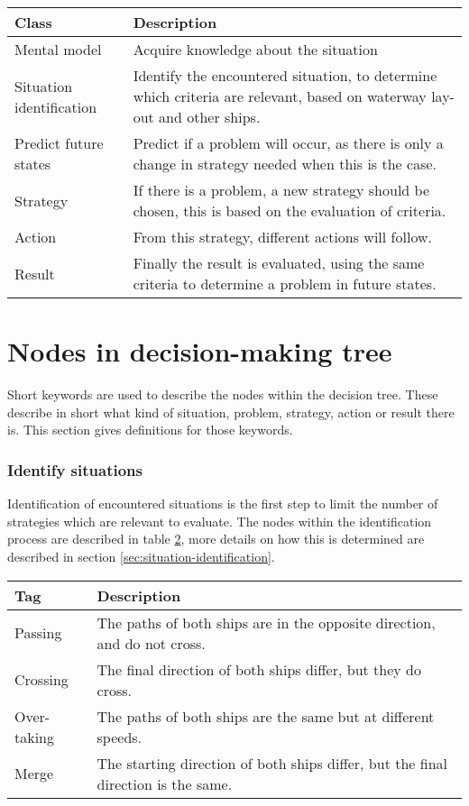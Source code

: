 \begin{table}[H]
	\begin{tabular}{p{}|p{}}
		\toprule
		Class & Description\\
		\midrule
		Mental model & Acquire knowledge about the situation \\
		Situation identification & Identify the encountered situation, to determine which criteria are relevant, based on waterway lay-out and other ships. \\
		Predict future states & Predict if a problem will occur, as there is only a change in strategy needed when this is the case. \\
		Strategy & If there is a problem, a new strategy should be chosen, this is based on the evaluation of criteria. \\
		Action & From this strategy, different actions will follow. \\
		Result & Finally the result is evaluated, using the same criteria to determine a problem in future states. \\
		\bottomrule
	\end{tabular}
	
	\label{tab:phases-description}
\end{table}

\section{Nodes in decision-making tree}
Short keywords are used to describe the nodes within the decision tree. These describe in short what kind of situation, problem, strategy, action or result there is. This section gives definitions for those keywords.

\subsubsection{Identify situations}
Identification of encountered situations is the first step to limit the number of strategies which are relevant to evaluate. The nodes within the identification process are described in table \ref{tab:situations}, more details on how this is determined are described in section \ref{sec:situation-identification}.
\begin{table}[H]
	\begin{tabular}{p{}|p{}}
		\toprule
		Tag & Description\\
		\midrule
		Passing & The paths of both ships are in the opposite direction, and do not cross. \\
		Crossing & The final direction of both ships differ, but they do cross. \\
		Over-taking & The paths of both ships are the same but at different speeds. \\
		Merge & The starting direction of both ships differ, but the final direction is the same. \\
		\bottomrule
	\end{tabular}
	
	\label{tab:situations}
\end{table}


